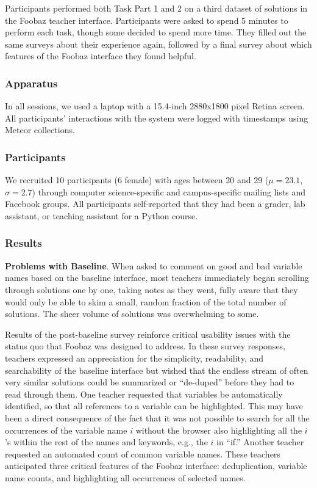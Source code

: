 Participants performed both Task Part 1 and 2 on a third dataset of solutions in the Foobaz teacher interface. Participants were asked to spend 5 minutes to perform each task, though some decided to spend more time. They filled out the same surveys about their experience again, followed by a final survey about which features of the Foobaz interface they found helpful. 

\subsubsection{Apparatus}

In all sessions, we used a laptop with a 15.4-inch 2880x1800 pixel Retina screen. All participants' interactions with the system were logged with timestamps using Meteor collections.

\subsubsection{Participants}

We recruited 10 participants (6 female) with ages between 20 and 29 ($\mu=23.1$, $\sigma=2.7$) through computer science-specific and campus-specific mailing lists and Facebook groups. All participants self-reported that they had been a grader, lab assistant, or teaching assistant for a Python course. 

\subsubsection{Results}

\textbf{Problems with Baseline}. When asked to comment on good and bad variable names based on the baseline interface, most teachers immediately began scrolling through solutions one by one, taking notes as they went, fully aware that they would only be able to skim a small, random fraction of the total number of solutions. The sheer volume of solutions was overwhelming to some. 

Results of the post-baseline survey reinforce critical usability issues with the status quo that Foobaz was designed to address. In these survey responses, teachers expressed an appreciation for the simplicity, readability, and searchability of the baseline interface but wished that the endless stream of often very similar solutions could be summarized or ``de-duped'' before they had to read through them. One teacher requested that variables be automatically identified, so that all references to a variable can be highlighted. This may have been a direct consequence of the fact that it was not possible to search for all the occurrences of the variable name $i$ without the browser also highlighting all the $i$'s within the rest of the names and keywords, e.g., the $i$ in ``if.'' Another teacher requested an automated count of common variable names. These teachers anticipated three critical features of the Foobaz interface: deduplication, variable name counts, and highlighting all occurrences of selected names.

